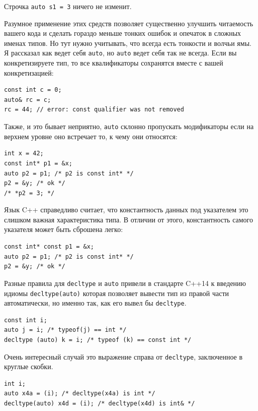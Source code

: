 \documentclass[a4paper,12pt,oneside]{article}
\begin{document}
Строчка \lstinline!auto s1 = 3! ничего не изменит.

Разумное применение этих средств позволяет существенно улучшить читаемость вашего кода и сделать гораздо меньше тонких ошибок и опечаток в сложных именах типов. Но тут нужно учитывать, что всегда есть тонкости и волчьи ямы. Я рассказал как ведет себя \lstinline!auto!, но \lstinline!auto! ведет себя так не всегда. Если вы конкретизируете тип, то все квалификаторы сохранятся вместе с вашей конкретизацией:

\begin{lstlisting}
const int c = 0;
auto& rc = c;
rc = 44; // error: const qualifier was not removed
\end{lstlisting}

Также, и это бывает неприятно, \lstinline!auto! склонно пропускать модификаторы если на верхнем уровне оно встречает то, к чему они относятся:

\begin{lstlisting}
int x = 42;
const int* p1 = &x;
auto p2 = p1; /* p2 is const int* */
p2 = &y; /* ok */
/* *p2 = 3; */
\end{lstlisting}

Язык C++ справедливо считает, что константность данных под указателем это слишком важная характеристика типа. В отличии от этого, константность самого указателя может быть сброшена легко:

\begin{lstlisting}
const int* const p1 = &x;
auto p2 = p1; /* p2 is const int* */
p2 = &y; /* ok */
\end{lstlisting}

Разные правила для \lstinline!decltype! и \lstinline!auto! привели в стандарте C++14 к введению идиомы \lstinline!decltype(auto)! которая позволяет вывести тип из правой части автоматически, но именно так, как его вывел бы \lstinline!decltype!.

\begin{lstlisting}
const int i;
auto j = i; /* typeof(j) == int */
decltype (auto) k = i; /* typeof (k) == const int */
\end{lstlisting}

Очень интересный случай это выражение справа от \lstinline!decltype!, заключенное в круглые скобки.

\begin{lstlisting}
int i;
auto x4a = (i); /* decltype(x4a) is int */
decltype(auto) x4d = (i); /* decltype(x4d) is int& */
\end{lstlisting}
\end{document}
